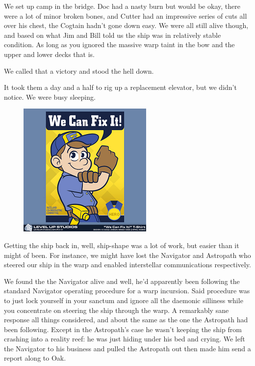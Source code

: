 We set up camp in the bridge. 
Doc had a nasty burn but would be okay, there were a lot of minor broken bones, and Cutter had an impressive series of cuts all over his chest, the Cogtain hadn't gone down easy. 
We were all still alive though, and based on what Jim and Bill told us the ship was in relatively stable condition. 
As long as you ignored the massive warp taint in the bow and the upper and lower decks that is.

We called that a victory and stood the hell down.

It took them a day and a half to rig up a replacement elevator, but we didn't notice. 
We were busy sleeping.

\begin{figure}
	\begin{center}
		\includegraphics[width=\figwidth]{pics/7/50.png}
	\end{center}
\end{figure}
Getting the ship back in, well, ship-shape was a lot of work, but easier than it might of been. 
For instance, we might have lost the Navigator and Astropath who steered our ship in the warp and enabled interstellar communications respectively.

We found the the Navigator alive and well, he’d apparently been following the standard Navigator operating procedure for a warp incursion. 
Said procedure was to just lock yourself in your sanctum and ignore all the daemonic silliness while you concentrate on steering the ship through the warp. 
A remarkably sane response all things considered, and about the same as the one the Astropath had been following. 
Except in the Astropath’s case he wasn’t keeping the ship from crashing into a reality reef: 
he was just hiding under his bed and crying. 
We left the Navigator to his business and pulled the Astropath out then made him send a report along to Oak.

